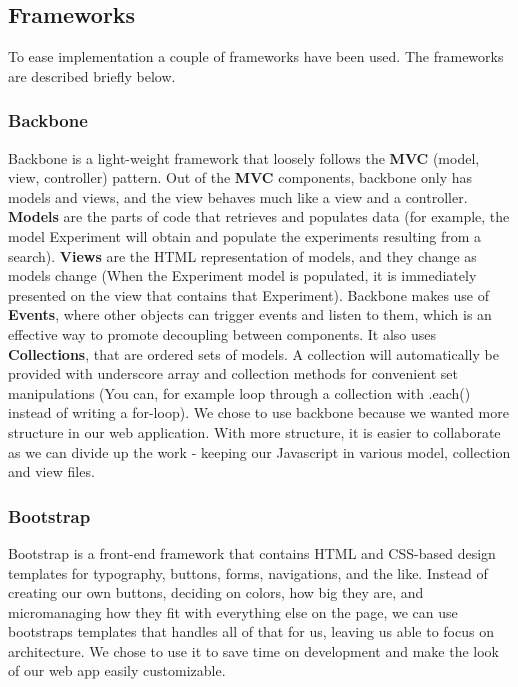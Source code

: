 

\subsection{Frameworks}
\label{sec:web_frame}
To ease implementation a couple of frameworks have been used. The frameworks are described briefly below.
\subsubsection{Backbone}
Backbone\cite{web_1} is a light-weight framework that loosely follows the \textbf{MVC} (model, view, controller) pattern. Out of the \textbf{MVC} components, backbone only has models and views, and the view behaves much like a view and a controller. \textbf{Models} are the parts of code that retrieves and populates data (for example, the model Experiment will obtain and populate the experiments resulting from a search). \textbf{Views} are the HTML representation of models, and they change as models change (When the Experiment model is populated, it is immediately presented on the view that contains that Experiment).
Backbone makes use of \textbf{Events}, where other objects can trigger events and listen to them, which is an effective way to promote decoupling between components. It also uses \textbf{Collections}, that are ordered sets of models. A collection will automatically be provided with underscore array and collection methods for convenient set manipulations (You can, for example loop through a collection with .each() instead of writing a for-loop). We chose to use backbone because we wanted more structure in our web application. With more structure, it is easier to collaborate as we can divide up the work - keeping our Javascript in various model, collection and view files.

\subsubsection{Bootstrap}
Bootstrap\cite{web_2} is a front-end framework that contains HTML and CSS-based design templates for typography, buttons, forms, navigations, and the like. Instead of creating our own buttons, deciding on colors, how big they are, and micromanaging how they fit with everything else on the page, we can use bootstraps templates that handles all of that for us, leaving us able to focus on architecture. We chose to use it to save time on development and make the look of our web app easily customizable.

